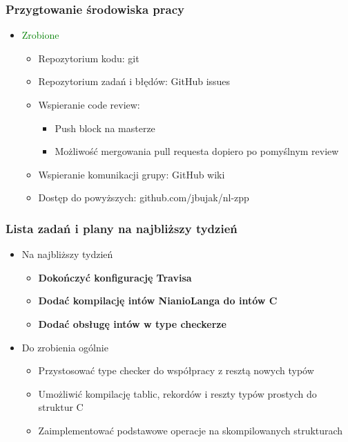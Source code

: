\documentclass{beamer}
\begin{document}
	\begin{frame}
		\frametitle{Przygtowanie środowiska pracy}
		\begin{itemize}
			\item\textcolor{green}{Zrobione}
			\begin{itemize}
				\item Repozytorium kodu: git
				\item Repozytorium zadań i błędów: GitHub issues
				\item Wspieranie code review:
					\begin{itemize}
					\item Push block na masterze
					\item Możliwość mergowania pull requesta dopiero po pomyślnym review
					\end{itemize}
				\item Wspieranie komunikacji grupy: GitHub wiki
				\item Dostęp do powyższych: github.com/jbujak/nl-zpp
			\end{itemize}
		\end{itemize}
	\end{frame}
	
	\begin{frame}
		\frametitle{Lista zadań i plany na najbliższy tydzień}
		\begin{itemize}
			\item{Na najbliższy tydzień}
			\begin{itemize}
				\item{\textbf{Dokończyć konfigurację Travisa}}
				\item{\textbf{Dodać kompilację intów NianioLanga do intów C}}
				\item{\textbf{Dodać obsługę intów w type checkerze}}
			\end{itemize}
			\item{Do zrobienia ogólnie}
			\begin{itemize}
				\item{Przystosować type checker do współpracy z resztą nowych typów}
				\item{Umożliwić kompilację tablic, rekordów i reszty typów prostych do struktur C}
				\item{Zaimplementować podstawowe operacje na skompilowanych strukturach}
			\end{itemize}
		\end{itemize}
	\end{frame}
\end{document}

